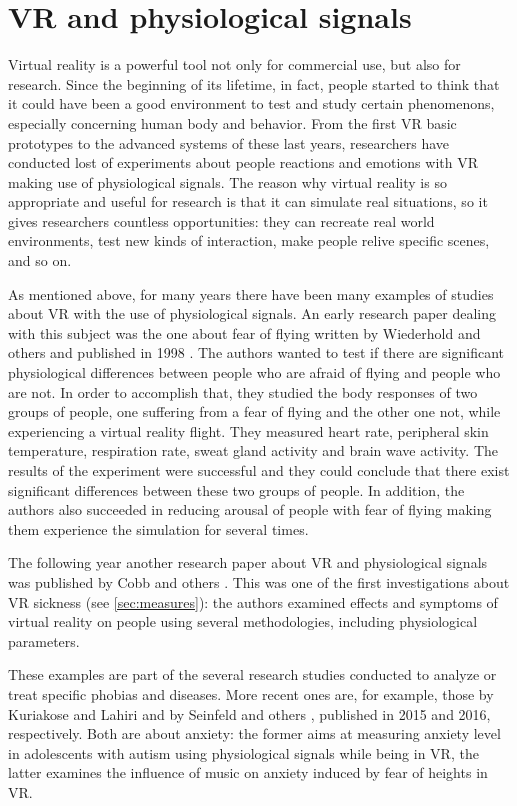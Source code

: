 \documentclass[binding=0.6cm,LaM]{sapthesis}
\begin{document}
\section{VR and physiological signals}
Virtual reality is a powerful tool not only for commercial use, but also for research. Since the beginning of its lifetime, in fact, people started to think that it could have been a good environment to test and study certain phenomenons, especially concerning human body and behavior. From the first VR basic prototypes to the advanced systems of these last years, researchers have conducted lost of experiments about people reactions and emotions with VR making use of physiological signals. The reason why virtual reality is so appropriate and useful for research is that it can simulate real situations, so it gives researchers countless opportunities: they can recreate real world environments, test new kinds of interaction, make people relive specific scenes, and so on. 

As mentioned above, for many years there have been many examples of studies about VR with the use of physiological signals. An early research paper dealing with this subject was the one about fear of flying written by Wiederhold and others and published in 1998 \cite{wiederhold1998fear}. The authors wanted to test if there are significant physiological differences between people who are afraid of flying and people who are not. In order to accomplish that, they studied the body responses of two groups of people, one suffering from a fear of flying and the other one not, while experiencing a virtual reality flight. They measured heart rate, peripheral skin temperature, respiration rate, sweat gland activity and brain wave activity. The results of the experiment were successful and they could conclude that there exist significant differences between these two groups of people. In addition, the authors also succeeded in reducing arousal of people with fear of flying making them experience the simulation for several times. 

The following year another research paper about VR and physiological signals was published by Cobb and others \cite{cobb1999virtual}. This was one of the first investigations about VR sickness (see \ref{sec:measures}): the authors examined effects and symptoms of virtual reality on people using several methodologies, including physiological parameters.

These examples are part of the several research studies conducted to analyze or treat specific phobias and diseases. More recent ones are, for example, those by Kuriakose and Lahiri \cite{kuriakose2015understanding} and by Seinfeld and others \cite{seinfeld2016influence}, published in 2015 and 2016, respectively. Both are about anxiety: the former aims at measuring anxiety level in adolescents with autism using physiological signals while being in VR, the latter examines the influence of music on anxiety induced by fear of heights in VR. 
\end{document}
